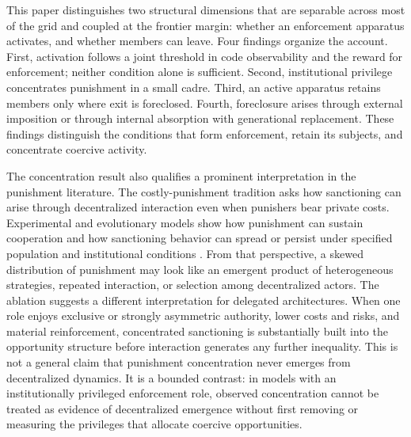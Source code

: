 \documentclass[12pt]{article}
\begin{document}
This paper distinguishes two structural dimensions that are separable across most of the grid and coupled at the frontier margin: whether an enforcement apparatus activates, and whether members can leave. Four findings organize the account. First, activation follows a joint threshold in code observability and the reward for enforcement; neither condition alone is sufficient. Second, institutional privilege concentrates punishment in a small cadre. Third, an active apparatus retains members only where exit is foreclosed. Fourth, foreclosure arises through external imposition or through internal absorption with generational replacement. These findings distinguish the conditions that form enforcement, retain its subjects, and concentrate coercive activity.

The concentration result also qualifies a prominent interpretation in the punishment literature. The costly-punishment tradition asks how sanctioning can arise through decentralized interaction even when punishers bear private costs. Experimental and evolutionary models show how punishment can sustain cooperation and how sanctioning behavior can spread or persist under specified population and institutional conditions \citep{fehrgachter2000,boydgintisbowles2010,hauertetal2007}. From that perspective, a skewed distribution of punishment may look like an emergent product of heterogeneous strategies, repeated interaction, or selection among decentralized actors. The ablation suggests a different interpretation for delegated architectures. When one role enjoys exclusive or strongly asymmetric authority, lower costs and risks, and material reinforcement, concentrated sanctioning is substantially built into the opportunity structure before interaction generates any further inequality. This is not a general claim that punishment concentration never emerges from decentralized dynamics. It is a bounded contrast: in models with an institutionally privileged enforcement role, observed concentration cannot be treated as evidence of decentralized emergence without first removing or measuring the privileges that allocate coercive opportunities.
\end{document}
